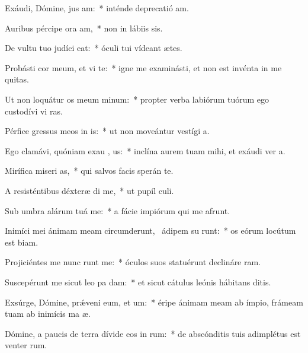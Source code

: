 \item Exáudi, Dómine, jus am:~* inténde deprecatió am.
\item Auribus pércipe ora am,~* non in lábiis sis.
\item De vultu tuo judíci  eat:~* óculi tui vídeant ætes.
\item Probásti cor meum, et vi te:~* igne me examinásti, et non est invénta in me quitas.
\item Ut non loquátur os meum  minum:~* propter verba labiórum tuórum ego custodívi vi ras.
\item Pérfice gressus meos in  is:~* ut non moveántur vestígi a.
\item Ego clamávi, quóniam exau , us:~* inclína aurem tuam mihi, et exáudi ver a.
\item Mirífica miseri as,~* qui salvos facis sperán  te.
\item A resisténtibus déxteræ  di me,~* ut pupíl culi.
\item Sub umbra alárum tuá  me:~* a fácie impiórum qui me afrunt.
\item Inimíci mei ánimam meam circumderunt,~\pscross{} ádipem su runt:~* os eórum locútum est biam.
\item Projiciéntes me nunc runt me:~* óculos suos statuérunt declináre  ram.
\item Suscepérunt me sicut leo pa  dam:~* et sicut cátulus leónis hábitans  ditis.
\item Exsúrge, Dómine, prǽveni eum, et  um:~* éripe ánimam meam ab ímpio, frámeam tuam ab inimícis ma æ.
\item Dómine, a paucis de terra dívide eos in  rum:~* de abscónditis tuis adimplétus est venter rum.
